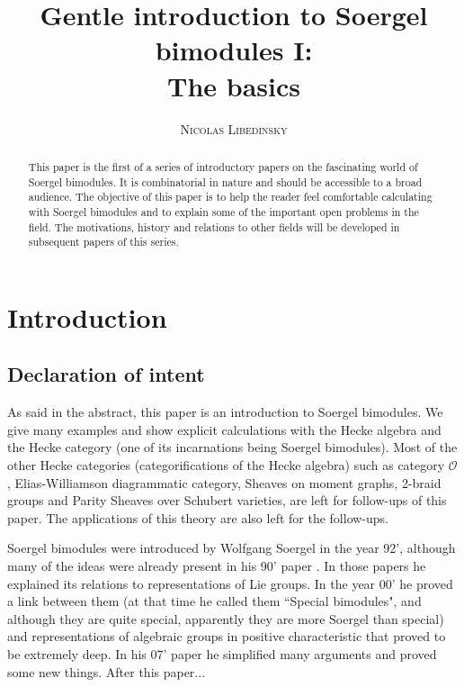 \documentclass[12pt]{wart}
\title[Gentle introduction to Soergel bimodules I]
 {Gentle introduction to Soergel bimodules I:\\
  \large The basics}
\author{\hspace{1.38cm} \textsc{Nicolas Libedinsky }}
\theoremstyle{remark}
\begin{document}
\begin{abstract}
This paper is the first of a series of introductory papers on the fascinating world of Soergel bimodules. It is  combinatorial  in nature and should be accessible to a broad audience. The objective of this paper is to help the reader feel comfortable calculating with Soergel bimodules and to explain some of the important open problems in the field. The motivations, history and relations to other fields will be developed in subsequent papers of this series.

\end{abstract}
\maketitle
\section{Introduction}




\subsection{Declaration of intent}



As said in the abstract, this paper is an introduction to  Soergel bimodules. We give many examples and show explicit calculations with the Hecke algebra and the Hecke category (one of its incarnations being Soergel bimodules). Most of the  other Hecke categories (categorifications of the Hecke algebra)  such as category $\mathcal{O}$, Elias-Williamson diagrammatic category, Sheaves on moment graphs, 2-braid groups and Parity Sheaves over Schubert varieties, are left for follow-ups of this paper. The applications of this theory are also left for the follow-ups. 

Soergel bimodules were introduced  by Wolfgang Soergel \cite{So0} in the year 92', although many of the ideas were already present in his 90' paper \cite{So-1}. In those papers he explained its relations to representations of Lie groups. In the year 00' he proved \cite{So1}  a link between them (at that time he called them ``Special bimodules", and although they are quite special, apparently they are more Soergel than special) and representations of algebraic groups in positive characteristic that proved to be extremely deep. In his 07' paper  \cite{So3} he simplified many arguments and proved some new things. After this paper...
\end{document}
